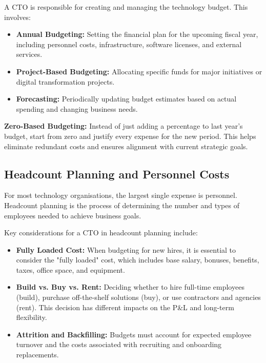 A \gls{CTO} is responsible for creating and managing the technology budget. This involves:

\begin{itemize}
    \item \textbf{Annual Budgeting:} Setting the financial plan for the upcoming fiscal year, including personnel costs, infrastructure, software licenses, and external services.
    \item \textbf{Project-Based Budgeting:} Allocating specific funds for major initiatives or digital transformation projects.
    \item \textbf{Forecasting:} Periodically updating budget estimates based on actual spending and changing business needs.
\end{itemize}

\begin{tipbox}
    \textbf{Zero-Based Budgeting:} Instead of just adding a percentage to last year's budget, start from zero and justify every expense for the new period. This helps eliminate redundant costs and ensures alignment with current strategic goals.
\end{tipbox}

\subsection{Headcount Planning and Personnel Costs}

For most technology organisations, the largest single expense is personnel. Headcount planning is the process of determining the number and types of employees needed to achieve business goals.

Key considerations for a \gls{CTO} in headcount planning include:
\begin{itemize}
    \item \textbf{Fully Loaded Cost:} When budgeting for new hires, it is essential to consider the "fully loaded" cost, which includes base salary, bonuses, benefits, taxes, office space, and equipment.
    \item \textbf{Build vs. Buy vs. Rent:} Deciding whether to hire full-time employees (build), purchase off-the-shelf solutions (buy), or use contractors and agencies (rent). This decision has different impacts on the \gls{P&L} and long-term flexibility.
    \item \textbf{Attrition and Backfilling:} Budgets must account for expected employee turnover and the costs associated with recruiting and onboarding replacements.
\end{itemize}

